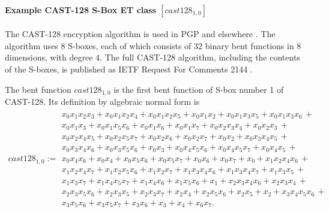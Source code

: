 \documentclass[12pt,a4paper]{article}
\begin{document}

\paragraph*{Example CAST-128 S-Box ET class $[cast128_{1,0}]$}

The CAST-128 encryption algorithm is used in PGP and elsewhere \cite{Ada97}.
The algorithm uses 8 S-boxes, each of which consists of 32 binary bent functions in 8 dimensions,
with degree 4.
The full CAST-128 algorithm, including the contents of the S-boxes,
is published as IETF Request For Comments 2144 \cite{RFC2144}.

The bent function $cast128_{1,0}$ is the first bent function of S-box number 1 of CAST-128.
Its definition by algebraic normal form is
\footnotesize{}
\begin{align*}
cast128_{1,0} :=
\begin{array}{l}
x_{0} x_{1} x_{2} x_{3} + x_{0} x_{1} x_{2} x_{4} + x_{0} x_{1} x_{2} x_{5} + x_{0} x_{1} x_{2} + x_{0} x_{1} x_{3} x_{5} + x_{0} x_{1} x_{3} x_{6}\, +
\\
x_{0} x_{1} x_{3} + x_{0} x_{1} x_{5} x_{6} + x_{0} x_{1} x_{6} + x_{0} x_{1} x_{7} + x_{0} x_{2} x_{3} x_{4} + x_{0} x_{2} x_{3}\, +
\\
x_{0} x_{2} x_{4} x_{5} + x_{0} x_{2} x_{5} x_{7} + x_{0} x_{2} x_{6} + x_{0} x_{2} x_{7} + x_{0} x_{2} + x_{0} x_{3} x_{4} x_{5}\, +
\\
x_{0} x_{3} x_{4} x_{6} + x_{0} x_{3} x_{5} x_{6} + x_{0} x_{3} + x_{0} x_{4} x_{5} x_{6} + x_{0} x_{4} x_{5} x_{7} + x_{0} x_{4} x_{5}\, +
\\
x_{0} x_{4} x_{6} + x_{0} x_{4} + x_{0} x_{5} x_{6} + x_{0} x_{5} x_{7} + x_{0} x_{6} + x_{0} x_{7} + x_{0} + x_{1} x_{2} x_{4} x_{6}\, +
\\
x_{1} x_{2} x_{4} x_{7} + x_{1} x_{2} x_{5} x_{6} + x_{1} x_{2} x_{7} + x_{1} x_{3} x_{4} x_{6} + x_{1} x_{3} x_{4} x_{7} + x_{1} x_{3} x_{5}\, +
\\
x_{1} x_{3} x_{7} + x_{1} x_{4} x_{5} x_{7} + x_{1} x_{4} x_{6} + x_{1} x_{5} x_{6} + x_{1} + x_{2} x_{3} x_{4} x_{6} + x_{2} x_{3} x_{4}\, +
\\
x_{2} x_{3} x_{5} x_{6} + x_{2} x_{3} x_{5} + x_{2} x_{3} x_{7} + x_{2} x_{4} + x_{2} x_{5} x_{6} + x_{2} x_{5} + x_{2} + x_{3} x_{4} x_{5} x_{6}\, +
\\
x_{3} x_{5} x_{6} + x_{3} x_{5} x_{7} + x_{3} x_{6} + x_{3} + x_{4} + x_{6} x_{7}.
\end{array}
\end{align*}
\normalsize{}
\end{document}

